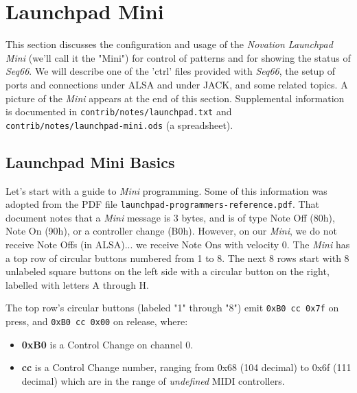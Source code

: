
%
%
%

\section{Launchpad Mini}
\label{sec:launchpad_mini}

   This section discusses the configuration and usage of the
   \textsl{Novation Launchpad Mini} (we'll call it the "Mini")
   for control of patterns
   and for showing the status of \textsl{Seq66}.
   We will describe one of the 'ctrl' files provided with \textsl{Seq66},
   the setup of ports and connections 
   under ALSA and under JACK, and some related topics.
   A picture of the \textsl{Mini} appears at the end of this section.
   Supplemental information is documented in
   \texttt{contrib/notes/launchpad.txt} and
   \texttt{contrib/notes/launchpad-mini.ods} (a spreadsheet).

\subsection{Launchpad Mini Basics}
\label{subsec:launchpad_mini_basics}

   Let's start with a guide to \textsl{Mini} programming.
   Some of this information was adopted from the PDF file
   \texttt{launchpad-programmers-reference.pdf}.
   That document notes that a \textsl{Mini}
   message is 3 bytes, and is of type Note Off (80h), Note On (90h), or a
   controller change (B0h).  However, on our \textsl{Mini},
   we do not receive Note Offs (in ALSA)... we receive Note Ons with velocity 0.
   The \textsl{Mini} has a top row of circular buttons numbered from 1 to 8.
   The next 8 rows start with 8 unlabeled square buttons on the left side
   with a circular button on the right, labelled with letters A through H.

   The top row's circular buttons (labeled "1" through "8")
   emit \texttt{0xB0 cc 0x7f} on press, and
   \texttt{0xB0 cc 0x00} on release, where:

   \begin{itemize}
      \item \textbf{0xB0}
         is a Control Change on channel 0.
      \item \textbf{cc}
         is a Control Change number, ranging from 0x68 (104 decimal)
         to 0x6f (111 decimal) which are in the range of
            \textsl{undefined} MIDI controllers.
   \end{itemize}

